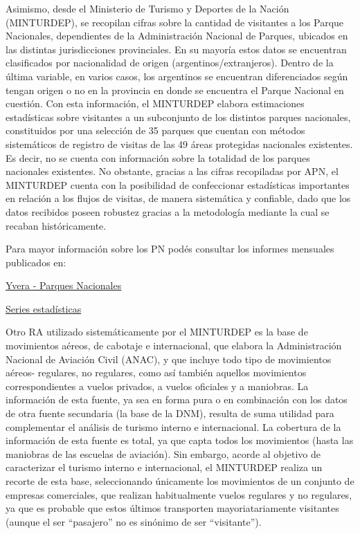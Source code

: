 \documentclass[
]{book}
\begin{document}
Asimismo, desde el Ministerio de Turismo y Deportes de la Nación (MINTURDEP), se recopilan cifras sobre la cantidad de visitantes a los Parque Nacionales, dependientes de la Administración Nacional de Parques, ubicados en las distintas jurisdicciones provinciales. En su mayoría estos datos se encuentran clasificados por nacionalidad de origen (argentinos/extranjeros). Dentro de la última variable, en varios casos, los argentinos se encuentran diferenciados según tengan origen o no en la provincia en donde se encuentra el Parque Nacional en cuestión. Con esta información, el MINTURDEP elabora estimaciones estadísticas sobre visitantes a un subconjunto de los distintos parques nacionales, constituidos por una selección de 35 parques que cuentan con métodos sistemáticos de registro de visitas de las 49 áreas protegidas nacionales existentes. Es decir, no se cuenta con información sobre la totalidad de los parques nacionales existentes. No obstante, gracias a las cifras recopiladas por APN, el MINTURDEP cuenta con la posibilidad de confeccionar estadísticas importantes en relación a los flujos de visitas, de manera sistemática y confiable, dado que los datos recibidos poseen robustez gracias a la metodología mediante la cual se recaban históricamente.

Para mayor información sobre los PN podés consultar los informes mensuales publicados en:

\href{https://www.yvera.tur.ar/estadistica/info/parques-nacionales}{Yvera - Parques Nacionales}

\href{http://datos.yvera.gob.ar/dataset/parques-nacionales}{Series estadísticas}

Otro RA utilizado sistemáticamente por el MINTURDEP es la base de movimientos aéreos, de cabotaje e internacional, que elabora la Administración Nacional de Aviación Civil (ANAC), y que incluye todo tipo de movimientos aéreos- regulares, no regulares, como así también aquellos movimientos correspondientes a vuelos privados, a vuelos oficiales y a maniobras. La información de esta fuente, ya sea en forma pura o en combinación con los datos de otra fuente secundaria (la base de la DNM), resulta de suma utilidad para complementar el análisis de turismo interno e internacional. La cobertura de la información de esta fuente es total, ya que capta todos los movimientos (hasta las maniobras de las escuelas de aviación). Sin embargo, acorde al objetivo de caracterizar el turismo interno e internacional, el MINTURDEP realiza un recorte de esta base, seleccionando únicamente los movimientos de un conjunto de empresas comerciales, que realizan habitualmente vuelos regulares y no regulares, ya que es probable que estos últimos transporten mayoriatariamente visitantes (aunque el ser ``pasajero'' no es sinónimo de ser ``visitante'').
\end{document}
